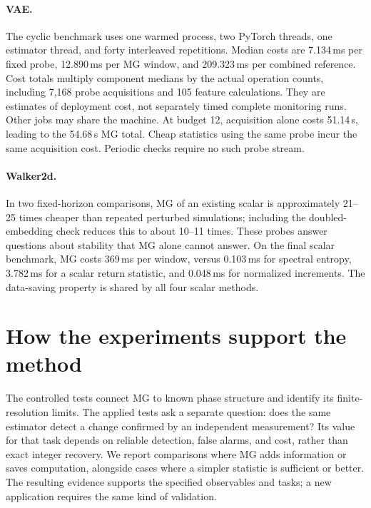 {\paragraph{VAE.}
The cyclic benchmark uses one warmed process, two PyTorch threads, one estimator thread, and forty interleaved repetitions. Median costs are 7.134\,ms per fixed probe, 12.890\,ms per MG window, and 209.323\,ms per combined reference. Cost totals multiply component medians by the actual operation counts, including 7,168 probe acquisitions and 105 feature calculations. They are estimates of deployment cost, not separately timed complete monitoring runs. Other jobs may share the machine. At budget 12, acquisition alone costs 51.14\,s, leading to the 54.68\,s MG total. Cheap statistics using the same probe incur the same acquisition cost. Periodic checks require no such probe stream.

\paragraph{Walker2d.}
In two fixed-horizon comparisons, MG of an existing scalar is approximately 21--25 times cheaper than repeated perturbed simulations; including the doubled-embedding check reduces this to about 10--11 times. These probes answer questions about stability that MG alone cannot answer. On the final scalar benchmark, MG costs 369\,ms per window, versus 0.103\,ms for spectral entropy, 3.782\,ms for a scalar return statistic, and 0.048\,ms for normalized increments. The data-saving property is shared by all four scalar methods.

\section{How the experiments support the method}
The controlled tests connect MG to known phase structure and identify its finite-resolution limits. The applied tests ask a separate question: does the same estimator detect a change confirmed by an independent measurement? Its value for that task depends on reliable detection, false alarms, and cost, rather than exact integer recovery. We report comparisons where MG adds information or saves computation, alongside cases where a simpler statistic is sufficient or better. The resulting evidence supports the specified observables and tasks; a new application requires the same kind of validation.
}

